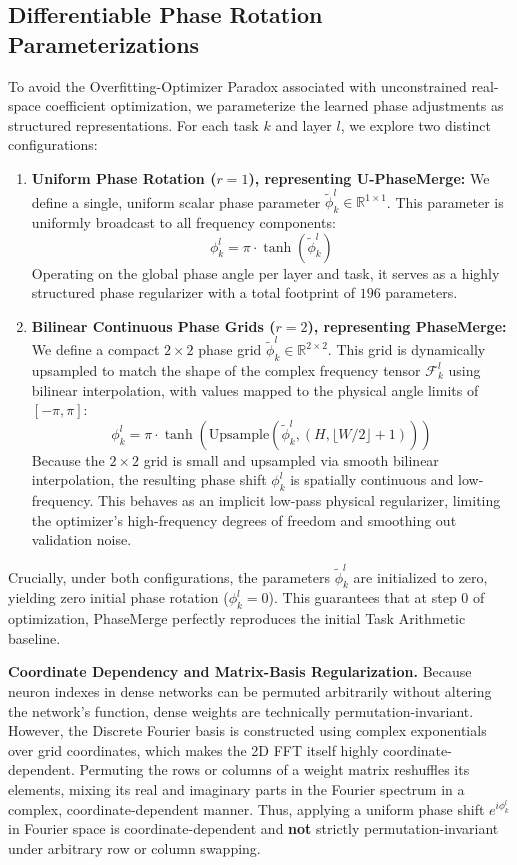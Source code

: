 \subsection{Differentiable Phase Rotation Parameterizations}
To avoid the Overfitting-Optimizer Paradox associated with unconstrained real-space coefficient optimization, we parameterize the learned phase adjustments as structured representations. For each task $k$ and layer $l$, we explore two distinct configurations:
\begin{enumerate}
    \item \textbf{Uniform Phase Rotation ($r=1$), representing U-PhaseMerge:} We define a single, uniform scalar phase parameter $\tilde{\phi}_k^l \in \mathbb{R}^{1 \times 1}$. This parameter is uniformly broadcast to all frequency components:
    \begin{equation}
        \phi_k^l = \pi \cdot \tanh\left( \tilde{\phi}_k^l \right)
    \end{equation}
    Operating on the global phase angle per layer and task, it serves as a highly structured phase regularizer with a total footprint of $196$ parameters.
    \item \textbf{Bilinear Continuous Phase Grids ($r=2$), representing PhaseMerge:} We define a compact $2 \times 2$ phase grid $\tilde{\phi}_k^l \in \mathbb{R}^{2 \times 2}$. This grid is dynamically upsampled to match the shape of the complex frequency tensor $\mathcal{F}_k^l$ using bilinear interpolation, with values mapped to the physical angle limits of $[-\pi, \pi]$:
    \begin{equation}
        \phi_k^l = \pi \cdot \tanh\left( \text{Upsample}\left( \tilde{\phi}_k^l, \left(H, \lfloor W/2 \rfloor + 1\right) \right) \right)
    \end{equation}
    Because the $2 \times 2$ grid is small and upsampled via smooth bilinear interpolation, the resulting phase shift $\phi_k^l$ is spatially continuous and low-frequency. This behaves as an implicit low-pass physical regularizer, limiting the optimizer's high-frequency degrees of freedom and smoothing out validation noise.
\end{enumerate}
Crucially, under both configurations, the parameters $\tilde{\phi}_k^l$ are initialized to zero, yielding zero initial phase rotation ($\phi_k^l = 0$). This guarantees that at step 0 of optimization, PhaseMerge perfectly reproduces the initial Task Arithmetic baseline.

\textbf{Coordinate Dependency and Matrix-Basis Regularization.} Because neuron indexes in dense networks can be permuted arbitrarily without altering the network's function, dense weights are technically permutation-invariant. However, the Discrete Fourier basis is constructed using complex exponentials over grid coordinates, which makes the 2D FFT itself highly coordinate-dependent. Permuting the rows or columns of a weight matrix reshuffles its elements, mixing its real and imaginary parts in the Fourier spectrum in a complex, coordinate-dependent manner. Thus, applying a uniform phase shift $e^{i \phi_k^l}$ in Fourier space is coordinate-dependent and \textbf{not} strictly permutation-invariant under arbitrary row or column swapping. 

